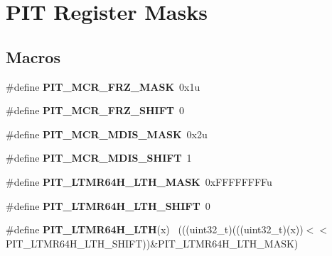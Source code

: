 \hypertarget{group___p_i_t___register___masks}{}\section{P\+I\+T Register Masks}
\label{group___p_i_t___register___masks}
\subsection*{Macros}
\begin{DoxyCompactItemize}
\item 
\hypertarget{group___p_i_t___register___masks_ga8149a0bb21843632dd4528b540480ba7}{}\#define {\bfseries P\+I\+T\+\_\+\+M\+C\+R\+\_\+\+F\+R\+Z\+\_\+\+M\+A\+S\+K}~0x1u\label{group___p_i_t___register___masks_ga8149a0bb21843632dd4528b540480ba7}

\item 
\hypertarget{group___p_i_t___register___masks_ga500ccd29eaebc20aa853e7bbb23e3c0c}{}\#define {\bfseries P\+I\+T\+\_\+\+M\+C\+R\+\_\+\+F\+R\+Z\+\_\+\+S\+H\+I\+F\+T}~0\label{group___p_i_t___register___masks_ga500ccd29eaebc20aa853e7bbb23e3c0c}

\item 
\hypertarget{group___p_i_t___register___masks_ga024258b2c23ff75f3e161e56adbbe733}{}\#define {\bfseries P\+I\+T\+\_\+\+M\+C\+R\+\_\+\+M\+D\+I\+S\+\_\+\+M\+A\+S\+K}~0x2u\label{group___p_i_t___register___masks_ga024258b2c23ff75f3e161e56adbbe733}

\item 
\hypertarget{group___p_i_t___register___masks_ga7ddcd16550ff71e4ee5ac48022ae6fb6}{}\#define {\bfseries P\+I\+T\+\_\+\+M\+C\+R\+\_\+\+M\+D\+I\+S\+\_\+\+S\+H\+I\+F\+T}~1\label{group___p_i_t___register___masks_ga7ddcd16550ff71e4ee5ac48022ae6fb6}

\item 
\hypertarget{group___p_i_t___register___masks_ga2f52ce484f53348d406fae4b3cac7fdf}{}\#define {\bfseries P\+I\+T\+\_\+\+L\+T\+M\+R64\+H\+\_\+\+L\+T\+H\+\_\+\+M\+A\+S\+K}~0x\+F\+F\+F\+F\+F\+F\+F\+Fu\label{group___p_i_t___register___masks_ga2f52ce484f53348d406fae4b3cac7fdf}

\item 
\hypertarget{group___p_i_t___register___masks_gaf355862db7eafd261031477364a6ef8d}{}\#define {\bfseries P\+I\+T\+\_\+\+L\+T\+M\+R64\+H\+\_\+\+L\+T\+H\+\_\+\+S\+H\+I\+F\+T}~0\label{group___p_i_t___register___masks_gaf355862db7eafd261031477364a6ef8d}

\item 
\hypertarget{group___p_i_t___register___masks_ga3eb34b6683a77fcd8b280fa41e513cb2}{}\#define {\bfseries P\+I\+T\+\_\+\+L\+T\+M\+R64\+H\+\_\+\+L\+T\+H}(x)                                          ~(((uint32\+\_\+t)(((uint32\+\_\+t)(x))$<$$<$P\+I\+T\+\_\+\+L\+T\+M\+R64\+H\+\_\+\+L\+T\+H\+\_\+\+S\+H\+I\+F\+T))\&P\+I\+T\+\_\+\+L\+T\+M\+R64\+H\+\_\+\+L\+T\+H\+\_\+\+M\+A\+S\+K)\label{group___p_i_t___register___masks_ga3eb34b6683a77fcd8b280fa41e513cb2}


\end{DoxyCompactItemize}
